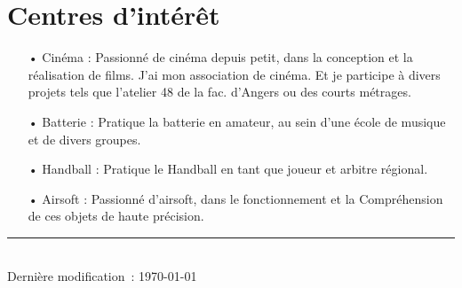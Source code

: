 \documentclass[french]{article}
\begin{document}
\section*{Centres d'intérêt}
\begin{itemize}	
	\item[• Cinéma :] Passionné de cinéma depuis petit, dans la conception et la réalisation de films. J'ai mon association de cinéma. Et je participe à divers projets tels que l’atelier 48 de la fac. d’Angers ou des courts métrages.
	
	\item[• Batterie :] Pratique la batterie en amateur, au sein d'une école de musique et de divers groupes.

	\item[• Handball :] Pratique le Handball en tant que joueur et arbitre régional.

	\item[• Airsoft :] Passionné d'airsoft, dans le fonctionnement et la Compréhension de ces objets de haute précision.

\end{itemize}

\centering
\rule{0.25\linewidth}{0.4pt}\\
\medskip
Dernière modification : \today
\end{document}
